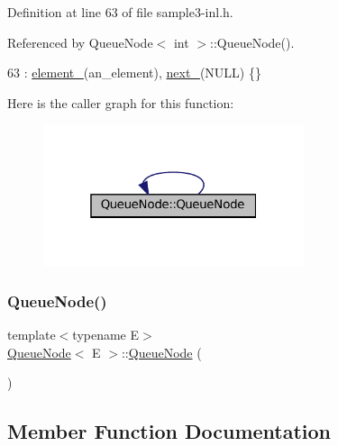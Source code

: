 Definition at line 63 of file sample3-\/inl.\+h.



Referenced by Queue\+Node$<$ int $>$\+::\+Queue\+Node().


\begin{DoxyCode}
63 : \hyperlink{classQueueNode_a593f0f5862848c1e9063d32ea3438b58}{element\_}(an\_element), \hyperlink{classQueueNode_a7434603f6c25418f7810f041752876bd}{next\_}(NULL) \{\}
\end{DoxyCode}
Here is the caller graph for this function\+:
\nopagebreak
\begin{figure}[H]
\begin{center}
\leavevmode
\includegraphics[width=217pt]{classQueueNode_a2c22feef35d910bec7138598e8784e25_icgraph}
\end{center}
\end{figure}
\mbox{\label{classQueueNode_a35adcad7a84db46784907cf58106d585}} 
\subsubsection{\texorpdfstring{Queue\+Node()}{QueueNode()}\hspace{0.1cm}{\footnotesize\ttfamily [2/2]}}
{\footnotesize\ttfamily template$<$typename E$>$ \\
\hyperlink{classQueueNode}{Queue\+Node}$<$ E $>$\+::\hyperlink{classQueueNode}{Queue\+Node} (\begin{DoxyParamCaption}\item[{const \hyperlink{classQueueNode}{Queue\+Node}$<$ E $>$ \&}]{ }\end{DoxyParamCaption})\hspace{0.3cm}{\ttfamily [private]}}



\subsection{Member Function Documentation}
\mbox{\label{classQueueNode_a1c61b3ed32e089f5901b87022ef84985}} 
